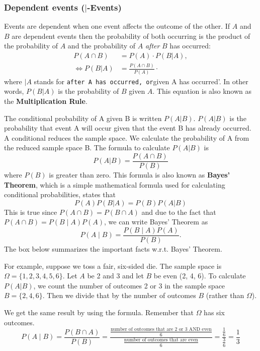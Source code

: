 \documentclass[
  12pt,
  oneside]{book}
\theoremstyle{definition}
\theoremstyle{definition}
\theoremstyle{definition}
\theoremstyle{definition}
\theoremstyle{remark}
\begin{document}
\subsubsection{\texorpdfstring{Dependent events (\(|\)-Events)}{Dependent events (\textbar-Events)}}\label{dependent-events--events}

Events are dependent when one event affects the outcome of the other. If \(A\) and \(B\) are dependent events then the probability of both occurring is the product of the probability of \(A\) and the probability of \(A\) \emph{after} \(B\) has occurred:
\begin{align*}
    P(A \cap B)&=P(A)\cdot P(B|A),\\
    \Leftrightarrow P(B|A)&=\frac{P(A \cap B)}{P(A)}\cdot 
\end{align*}
where \(|A\) stands for \texttt{after\ A\ has\ occurred\textquotesingle{},\ or}given A has occurred'. In other words, \(P(B|A)\) is the probability of \(B\) given \(A\). This equation is also known as the \textbf{Multiplication Rule}.

The conditional probability of A given B is written \(P(A|B)\). \(P(A|B)\) is the probability that event A will occur given that the event B has already occurred. A conditional reduces the sample space. We calculate the probability of A from the reduced sample space B. The formula to calculate \(P(A|B)\) is \[ P(A|B) = \frac{P\left(A\cap B\right)}{P\left(B\right)}\] where \(P(B)\) is greater than zero.
This formula is also known as \textbf{Bayes' Theorem}, which is a simple mathematical formula used for calculating conditional probabilities, states that
\[
P(A)P(B|A)=P(B)P(A|B)
\]
This is true since \(P(A \cap B)=P(B \cap A)\) and due to the fact that \(P(A\cap B)=P(B\mid A)P(A)\), we can write Bayes' Theorem as
\[P(A\mid B)={\frac {P(B\mid A)P(A)}{P(B)}}.\]
The box below summarizes the important facts w.r.t. Bayes' Theorem.

For example, suppose we toss a fair, six-sided die. The sample space is
\(\Omega = \{1, 2, 3, 4, 5, 6\}\). Let \(A\) be 2 and 3 and let \(B\) be even (2, 4, 6). To calculate \(P(A|B)\), we count the number of outcomes 2 or 3 in the sample space \(B = \{2, 4, 6\}\). Then we divide that by the number of outcomes \(B\) (rather than \(\Omega\)).

We get the same result by using the formula. Remember that \(\Omega\) has six outcomes.
\[P(A\mid B)=\frac{P(B\cap A)}{P(B)} = \frac{\frac{\text{number of outcomes that are 2 or 3 AND even}}{6}}{\frac{\text{number of outcomes that are even}}{6}}=\frac{\frac{1}{6}}{\frac{3}{6}}=\frac{1}{3} \]
\end{document}
